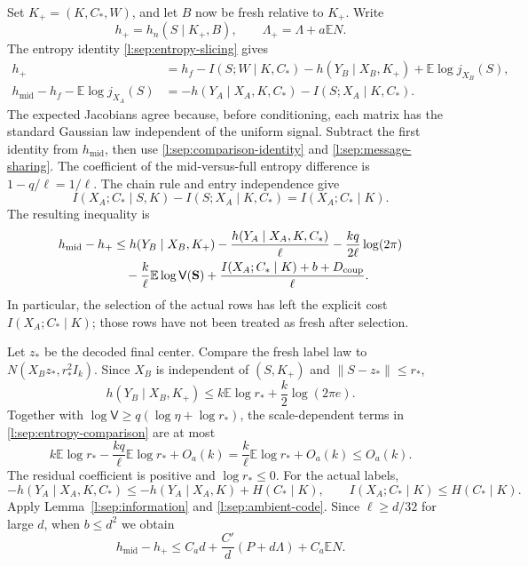 Set \(K_+=(K,C_*,W)\), and let \(B\) now be fresh relative to
\(K_+\).  Write
\[
 h_+=h_n(S\mid K_+,B),\qquad
 \Lambda_+=\Lambda+a\mathbb E N.
\]
The entropy identity \eqref{l:sep:entropy-slicing} gives
\begin{align*}
 h_+&=h_f-I(S;W\mid K,C_*)-h(Y_B\mid X_B,K_+)
                         +\mathbb E\log j_{X_B}(S),\\
 h_{\mathrm{mid}}-h_f-\mathbb E\log j_{X_A}(S)
   &=-h(Y_A\mid X_A,K,C_*)-I(S;X_A\mid K,C_*).
\end{align*}
The expected Jacobians agree because, before conditioning, each
matrix has the standard Gaussian law independent of the uniform
signal.  Subtract the first identity from \(h_{\mathrm{mid}}\),
then use \eqref{l:sep:comparison-identity} and
\eqref{l:sep:message-sharing}.  The coefficient of the
mid-versus-full entropy difference is \(1-q/\ell=1/\ell\).
The chain rule and entry independence give
\[
 I(X_A;C_*\mid S,K)-I(S;X_A\mid K,C_*)
       =I(X_A;C_*\mid K).
\]
The resulting inequality is
\begin{align}
 h_{\mathrm{mid}}-h_+
 &\le h(Y_B\mid X_B,K_+)
       -\frac{h(Y_A\mid X_A,K,C_*)}{\ell}
       -\frac{kq}{2\ell}\log(2\pi) \notag\\
 &\quad-\frac{k}{\ell}\mathbb E\log\mathsf V(\mathbf S)
       +\frac{I(X_A;C_*\mid K)+b+D_{\mathrm{coup}}}{\ell}.
 \label{l:sep:entropy-comparison}
\end{align}
In particular, the selection of the actual rows has left the
explicit cost \(I(X_A;C_*\mid K)\); those rows have not been treated
as fresh after selection.

Let \(z_*\) be the decoded final center.  Compare the fresh label
law to \(N(X_Bz_*,r_*^2I_k)\).  Since \(X_B\) is independent of
\((S,K_+)\) and \(\|S-z_*\|\le r_*\),
\[
 h(Y_B\mid X_B,K_+)
 \le k\mathbb E\log r_*+\frac{k}{2}\log(2\pi e).
\]
Together with \(\log\mathsf V\ge q(\log\eta+\log r_*)\), the
scale-dependent terms in \eqref{l:sep:entropy-comparison} are at most
\[
 k\mathbb E\log r_*-\frac{kq}{\ell}\mathbb E\log r_*+O_a(k)
 =\frac{k}{\ell}\mathbb E\log r_*+O_a(k)\le O_a(k).
\]
The residual coefficient is positive and \(\log r_*\le0\).
For the actual labels,
\[
 -h(Y_A\mid X_A,K,C_*)
 \le-h(Y_A\mid X_A,K)+H(C_*\mid K),\qquad
 I(X_A;C_*\mid K)\le H(C_*\mid K).
\]
Apply Lemma~\ref{l:sep:information} and
\eqref{l:sep:ambient-code}.  Since \(\ell\ge d/32\) for large
\(d\), when \(b\le d^2\) we obtain
\begin{equation}
 h_{\mathrm{mid}}-h_+
 \le C_a d+\frac{C'}d(P+d\Lambda)+C_a\mathbb E N.
 \label{l:sep:one-block}
\end{equation}

